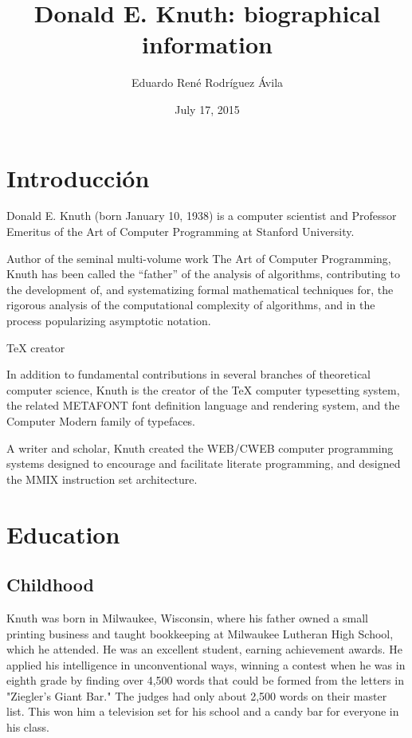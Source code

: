 \documentclass[10pt,letterpaper]{book}
\title{Donald E. Knuth: biographical information}
\author{Eduardo René Rodríguez Ávila}
\date{July 17, 2015}
\begin{document}
\frontmatter
\maketitle
\tableofcontents

\chapter{Introducción}

Donald E. Knuth (born January 10, 1938) is a computer scientist 
and Professor Emeritus of the Art of Computer Programming at 
Stanford University.

Author of the seminal multi-volume work The Art of Computer Programming, 
Knuth has been called the ``father'' of the analysis of algorithms, 
contributing to the development of, and systematizing formal mathematical 
techniques for, the rigorous analysis of the computational complexity of 
algorithms, and in the process popularizing asymptotic notation.

TeX creator

In addition to fundamental contributions in several branches of theoretical 
computer science, Knuth is the creator of the TeX computer typesetting 
system, the related METAFONT font definition language and rendering system, 
and the Computer Modern family of typefaces.

A writer and scholar, Knuth created the WEB/CWEB computer programming 
systems designed to encourage and facilitate literate programming, 
and designed the MMIX instruction set architecture.

\mainmatter
	\chapter{Education}
		\section{Childhood}

Knuth was born in Milwaukee, Wisconsin, where his father owned a small 
printing business and taught bookkeeping at Milwaukee Lutheran High 
School, which he attended. He was an excellent student, earning achievement 
awards. He applied his intelligence in unconventional ways, winning a contest 
when he was in eighth grade by finding over 4,500 words that could be formed 
from the letters in "Ziegler's Giant Bar." The judges had only about 
2,500 words on their master list. This won him a television set for his school 
and a candy bar for everyone in his class.
\end{document}
